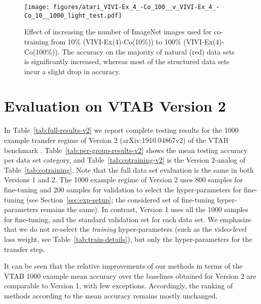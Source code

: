\documentclass[10pt,twocolumn,letterpaper]{article}
\begin{document}
{\begin{figure}[h]
\centering
\texttt{[image: figures/atari\_VIVI-Ex\_4\_-Co\_100\_\_v\_VIVI-Ex\_4\_-Co\_10\_\_1000\_light\_test.pdf]}
\caption{Effect of increasing the number of ImageNet images used for co-training from 10\% (VIVI-Ex(4)-Co(10\%)) to 100\% (VIVI-Ex(4)-Co(100\%)). The accuracy on the majority of natural (red) data sets is significantly increased, whereas most of the structured data sets incur a slight drop in accuracy.}
\label{fig:atari6}
\end{figure}

\FloatBarrier

\section{Evaluation on VTAB Version 2} \label{sec:vtab-v2}

In Table~\ref{tab:full-results-v2} we report complete testing results for the 1000 example transfer regime of Version 2 (arXiv:1910.04867v2) of the VTAB benchmark \cite{zhai2019visual}. Table~\ref{tab:per-group-results-v2} shows the mean testing accuracy per data set category, and Table~\ref{tab:cotraining-v2} is the Version 2-analog of Table~\ref{tab:cotraining}. Note that the full data set evaluation is the same in both Versions 1 and 2. The 1000 example regime of Version 2 uses 800 samples for fine-tuning and 200 samples for validation to select the hyper-parameters for fine-tuning (see Section~\ref{sec:exp-setup}; the considered set of fine-tuning hyper-parameters remains the same). In contrast, Version 1 uses all the 1000 samples for fine-tuning, and the standard validation set for each data set. We emphasize that we do not re-select the \emph{training} hyper-parameters (such as the video-level loss weight, see Table~\ref{tab:train-details}), but only the hyper-parameters for the transfer step.

It can be seen that the relative improvements of our methods in terms of the VTAB 1000 example mean accuracy over the baselines obtained  for Version 2 are comparable to Version 1, with few exceptions. Accordingly, the ranking of methods according to the mean accuracy remains mostly unchanged.

}
\end{document}
